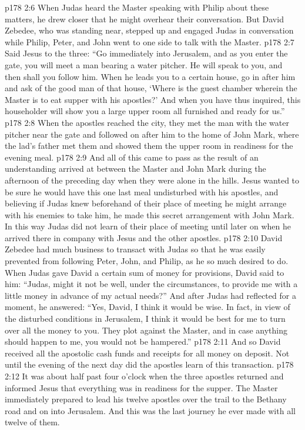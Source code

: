 \vs p178 2:6 When Judas heard the Master speaking with Philip about these matters, he drew closer that he might overhear their conversation. But David Zebedee, who was standing near, stepped up and engaged Judas in conversation while Philip, Peter, and John went to one side to talk with the Master.
\vs p178 2:7 Said Jesus to the three: \textcolor{ubdarkred}{“Go immediately into Jerusalem, and as you enter the gate, you will meet a man bearing a water pitcher. He will speak to you, and then shall you follow him. When he leads you to a certain house, go in after him and ask of the good man of that house, ‘Where is the guest chamber wherein the Master is to eat supper with his apostles?’ And when you have thus inquired, this householder will show you a large upper room all furnished and ready for us.”}
\vs p178 2:8 When the apostles reached the city, they met the man with the water pitcher near the gate and followed on after him to the home of John Mark, where the lad’s father met them and showed them the upper room in readiness for the evening meal.
\vs p178 2:9 And all of this came to pass as the result of an understanding arrived at between the Master and John Mark during the afternoon of the preceding day when they were alone in the hills. Jesus wanted to be sure he would have this one last meal undisturbed with his apostles, and believing if Judas knew beforehand of their place of meeting he might arrange with his enemies to take him, he made this secret arrangement with John Mark. In this way Judas did not learn of their place of meeting until later on when he arrived there in company with Jesus and the other apostles.
\pc \vs p178 2:10 David Zebedee had much business to transact with Judas so that he was easily prevented from following Peter, John, and Philip, as he so much desired to do. When Judas gave David a certain sum of money for provisions, David said to him: “Judas, might it not be well, under the circumstances, to provide me with a little money in advance of my actual needs?” And after Judas had reflected for a moment, he answered: “Yes, David, I think it would be wise. In fact, in view of the disturbed conditions in Jerusalem, I think it would be best for me to turn over all the money to you. They plot against the Master, and in case anything should happen to me, you would not be hampered.”
\vs p178 2:11 And so David received all the apostolic cash funds and receipts for all money on deposit. Not until the evening of the next day did the apostles learn of this transaction.
\pc \vs p178 2:12 It was about half past four o’clock when the three apostles returned and informed Jesus that everything was in readiness for the supper. The Master immediately prepared to lead his twelve apostles over the trail to the Bethany road and on into Jerusalem. And this was the last journey he ever made with all twelve of them.
